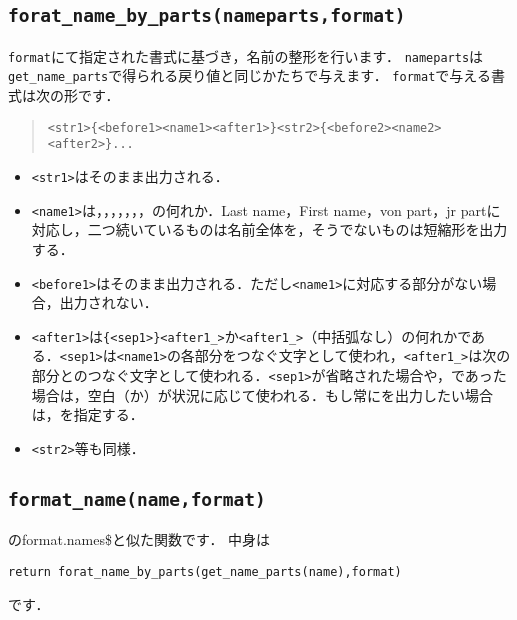 \documentclass[a4paper]{ltjsarticle}
\newcommand{\luafunc}[1]{\texttt{#1}}
\newcommand*{\luavar}[1]{\texttt{#1}}
\begin{document}
\subsection{\luafunc{forat\_name\_by\_parts(nameparts,format)}}
\luavar{format}にて指定された書式に基づき，名前の整形を行います．
\luavar{nameparts}は\luafunc{get\_name\_parts}で得られる戻り値と同じかたちで与えます．
\luavar{format}で与える書式は次の形です．
\begin{quote}
\begin{verbatim}
<str1>{<before1><name1><after1>}<str2>{<before2><name2><after2>}...
\end{verbatim}
\end{quote}
\begin{itemize}
\item \verb|<str1>|はそのまま出力される．
\item \verb|<name1>|は，，，，，，，の何れか．Last name，First name，von part，jr partに対応し，二つ続いているものは名前全体を，そうでないものは短縮形を出力する．
\item \verb|<before1>|はそのまま出力される．ただし\verb|<name1>|に対応する部分がない場合，出力されない．
\item \verb|<after1>|は\verb|{<sep1>}<after1_>|か\verb|<after1_>|（中括弧なし）の何れかである．\verb|<sep1>|は\verb|<name1>|の各部分をつなぐ文字として使われ，\verb|<after1_>|は次の部分とのつなぐ文字として使われる．\verb|<sep1>|が省略された場合や，\luastring{~}であった場合は，空白（\luastring{ }か\luastring{~}）が状況に応じて使われる．もし常に\luastring{~}を出力したい場合は，\luastring{~~}を指定する．
\item \verb|<str2>|等も同様．
\end{itemize}

\subsection{\luafunc{format\_name(name,format)}}
\BibTeX のformat.names\$と似た関数です．
中身は
\begin{lstlisting}
return forat_name_by_parts(get_name_parts(name),format)
\end{lstlisting}
です．
\end{document}
